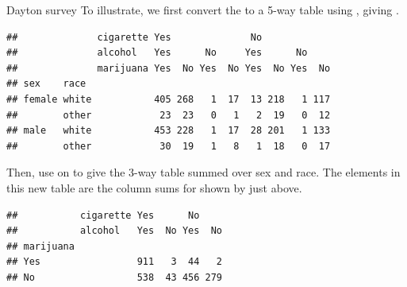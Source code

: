 \documentclass[11pt]{book}
\renewenvironment{knitrout}{\small\renewcommand{\baselinestretch}{.85}}{} %
\begin{document}
\begin{Example}[dayton2]{Dayton survey}
To illustrate, we first convert the  to a 5-way
table using , giving .  

\begin{knitrout}
\color{fgcolor}\begin{kframe}
\begin{alltt}
 \hlkwb{<-} \hlopt{~}\hlopt{+}\hlopt{+}\hlopt{+}\hlopt{+}
\hlopt{+}\hlopt{+} \hlopt{~} \hlopt{+} 
\end{alltt}
\begin{verbatim}
##              cigarette Yes              No            
##              alcohol   Yes      No     Yes      No    
##              marijuana Yes  No Yes  No Yes  No Yes  No
## sex    race                                           
## female white           405 268   1  17  13 218   1 117
##        other            23  23   0   1   2  19   0  12
## male   white           453 228   1  17  28 201   1 133
##        other            30  19   1   8   1  18   0  17
\end{verbatim}
\end{kframe}
\end{knitrout}
Then, use  on  to give the
3-way table  summed over sex and race.
The elements in this new table are the column sums for 
 shown by  just above.

\begin{knitrout}
\color{fgcolor}\begin{kframe}
\begin{alltt}
 \hlkwb{<-}  \hlstd{=}\hlopt{:}\hlstd{,} 
 \hlkwb{<-}  \hlopt{:}\hlstd{)}   
\hlopt{+} \hlopt{~}  
\end{alltt}
\begin{verbatim}
##           cigarette Yes      No    
##           alcohol   Yes  No Yes  No
## marijuana                          
## Yes                 911   3  44   2
## No                  538  43 456 279
\end{verbatim}
\end{kframe}
\end{knitrout}
\end{Example}
\end{document}
